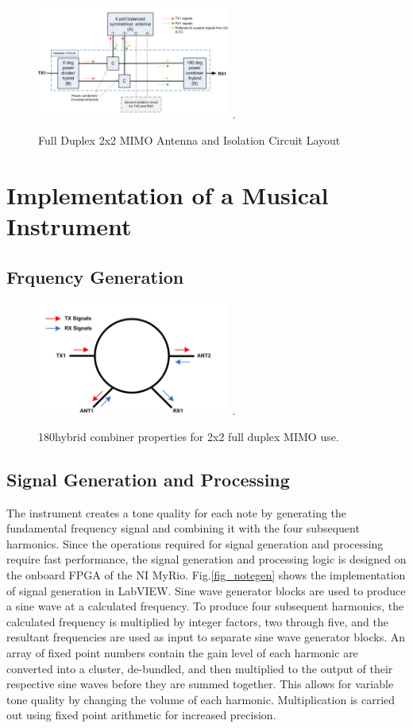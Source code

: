 \begin{figure}[!t]
\centering
\includegraphics[width=2.5in]{fdmimo2diagram.jpg}
\DeclareGraphicsExtensions.
\caption{Full Duplex 2x2 MIMO Antenna and Isolation Circuit Layout}
\label{fig_mimodiag}
\end{figure} 


\section{Implementation of a Musical Instrument}
\subsection{Frquency Generation}

\begin{figure}[!t]
\centering
\includegraphics[width=2.5in]{rrcomb.jpg}
\DeclareGraphicsExtensions.
\caption{180\degree\space hybrid combiner properties for 2x2 full duplex MIMO use.}
\label{fig_rrcomb}
\end{figure} 

\subsection{Signal Generation and Processing}
The instrument creates a tone quality for each note by generating the fundamental frequency signal and combining it with the four subsequent harmonics.
 Since the operations required for signal generation and processing require fast performance, the signal generation and processing logic is designed on the onboard FPGA of the NI MyRio.
 Fig.\ref{fig_notegen} shows the implementation of signal generation in LabVIEW. Sine wave generator blocks are used to produce a sine wave at a calculated frequency.
 To produce four subsequent harmonics, the calculated frequency is multiplied by integer factors, two through five, and the resultant frequencies are used as input to separate sine wave generator blocks.
 An array of fixed point numbers contain the gain level of each harmonic are converted into a cluster, de-bundled, and then multiplied to the output of their respective sine waves before they are summed together.
 This allows for variable tone quality by changing the volume of each harmonic. Multiplication is carried out using fixed point arithmetic for increased precision.

